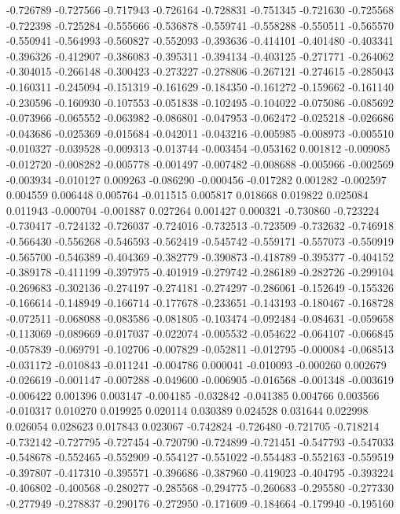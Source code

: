 -0.726789
-0.727566
-0.717943
-0.726164
-0.728831
-0.751345
-0.721630
-0.725568
-0.722398
-0.725284
-0.555666
-0.536878
-0.559741
-0.558288
-0.550511
-0.565570
-0.550941
-0.564993
-0.560827
-0.552093
-0.393636
-0.414101
-0.401480
-0.403341
-0.396326
-0.412907
-0.386083
-0.395311
-0.394134
-0.403125
-0.271771
-0.264062
-0.304015
-0.266148
-0.300423
-0.273227
-0.278806
-0.267121
-0.274615
-0.285043
-0.160311
-0.245094
-0.151319
-0.161629
-0.184350
-0.161272
-0.159662
-0.161140
-0.230596
-0.160930
-0.107553
-0.051838
-0.102495
-0.104022
-0.075086
-0.085692
-0.073966
-0.065552
-0.063982
-0.086801
-0.047953
-0.062472
-0.025218
-0.026686
-0.043686
-0.025369
-0.015684
-0.042011
-0.043216
-0.005985
-0.008973
-0.005510
-0.010327
-0.039528
-0.009313
-0.013744
-0.003454
-0.053162
0.001812
-0.009085
-0.012720
-0.008282
-0.005778
-0.001497
-0.007482
-0.008688
-0.005966
-0.002569
-0.003934
-0.010127
0.009263
-0.086290
-0.000456
-0.017282
0.001282
-0.002597
0.004559
0.006448
0.005764
-0.011515
0.005817
0.018668
0.019822
0.025084
0.011943
-0.000704
-0.001887
0.027264
0.001427
0.000321
-0.730860
-0.723224
-0.730417
-0.724132
-0.726037
-0.724016
-0.732513
-0.723509
-0.732632
-0.746918
-0.566430
-0.556268
-0.546593
-0.562419
-0.545742
-0.559171
-0.557073
-0.550919
-0.565700
-0.546389
-0.404369
-0.382779
-0.390873
-0.418789
-0.395377
-0.404152
-0.389178
-0.411199
-0.397975
-0.401919
-0.279742
-0.286189
-0.282726
-0.299104
-0.269683
-0.302136
-0.274197
-0.274181
-0.274297
-0.286061
-0.152649
-0.155326
-0.166614
-0.148949
-0.166714
-0.177678
-0.233651
-0.143193
-0.180467
-0.168728
-0.072511
-0.068088
-0.083586
-0.081805
-0.103474
-0.092484
-0.084631
-0.059658
-0.113069
-0.089669
-0.017037
-0.022074
-0.005532
-0.054622
-0.064107
-0.066845
-0.057839
-0.069791
-0.102706
-0.007829
-0.052811
-0.012795
-0.000084
-0.068513
-0.031172
-0.010843
-0.011241
-0.004786
0.000041
-0.010093
-0.000260
0.002679
-0.026619
-0.001147
-0.007288
-0.049600
-0.006905
-0.016568
-0.001348
-0.003619
-0.006422
0.001396
0.003147
-0.004185
-0.032842
-0.041385
0.004766
0.003566
-0.010317
0.010270
0.019925
0.020114
0.030389
0.024528
0.031644
0.022998
0.026054
0.028623
0.017843
0.023067
-0.742824
-0.726480
-0.721705
-0.718214
-0.732142
-0.727795
-0.727454
-0.720790
-0.724899
-0.721451
-0.547793
-0.547033
-0.548678
-0.552465
-0.552909
-0.554127
-0.551022
-0.554483
-0.552163
-0.559519
-0.397807
-0.417310
-0.395571
-0.396686
-0.387960
-0.419023
-0.404795
-0.393224
-0.406802
-0.400568
-0.280277
-0.285568
-0.294775
-0.260683
-0.295580
-0.277330
-0.277949
-0.278837
-0.290176
-0.272950
-0.171609
-0.184664
-0.179940
-0.195160
